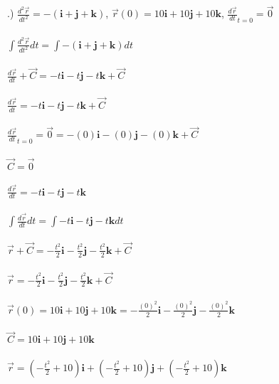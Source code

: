 \documentclass[12pt]{article}
\begin{document}
.) $\frac{d^{2}\vec{r}}{dt^{2}} = -(\mathbf{i} + \mathbf{j} + \mathbf{k})$, \hspace{10pt} $\vec{r}(0) = 10\mathbf{i} + 10 \mathbf{j} + 10 \mathbf{k}$, \hspace{10pt} $\frac{d\vec{r}}{dt}_{t = 0} = \vec{0}$\\\\
\noindent $\int\frac{d^{2}\vec{r}}{dt^{2}}  dt =   \int  -(\mathbf{i} + \mathbf{j} + \mathbf{k})  dt$\\\\
\noindent $\frac{d\vec{r}}{dt} + \vec{C} =  -t\mathbf{i} - t\mathbf{j} - t\mathbf{k} + \vec{C}$\\\\
\noindent $\frac{d\vec{r}}{dt} =  -t\mathbf{i} - t\mathbf{j} - t\mathbf{k} + \vec{C}$\\\\
\noindent $\frac{d\vec{r}}{dt}_{t = 0} = \vec{0} = -(0)\mathbf{i} - (0)\mathbf{j} - (0)\mathbf{k} + \vec{C}$ \\\\
\noindent $\vec{C} = \vec{0}$\\\\
\noindent $\frac{d\vec{r}}{dt}= -t\mathbf{i} - t\mathbf{j} - t\mathbf{k}$\\\\


\noindent $\int \frac{d\vec{r}}{dt} dt = \int -t\mathbf{i} - t\mathbf{j} - t\mathbf{k} dt$\\\\
\noindent $\vec{r} + \vec{C} = -\frac{t^{2}}{2}\mathbf{i} - \frac{t^{2}}{2}\mathbf{j} - \frac{t^{2}}{2}\mathbf{k} + \vec{C}$\\\\
\noindent $\vec{r} = -\frac{t^{2}}{2}\mathbf{i} - \frac{t^{2}}{2}\mathbf{j} - \frac{t^{2}}{2}\mathbf{k} + \vec{C}$\\\\
\noindent $\vec{r}(0) =10\mathbf{i} + 10 \mathbf{j} + 10 \mathbf{k}  = -\frac{(0)^{2}}{2}\mathbf{i} - \frac{(0)^{2}}{2}\mathbf{j} - \frac{(0)^{2}}{2}\mathbf{k}$\\\\
\noindent $\vec{C} = 10\mathbf{i} + 10 \mathbf{j} + 10 \mathbf{k} $\\\\
\noindent $\vec{r} = (-\frac{t^{2}}{2} + 10)\mathbf{i} + (-\frac{t^{2}}{2} + 10)\mathbf{j} + (-\frac{t^{2}}{2} + 10)\mathbf{k}$\\\\
\end{document}

